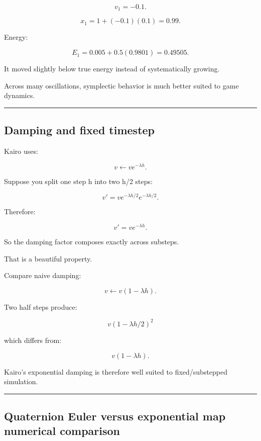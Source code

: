\[
v_1=-0.1.
\]

\[
x_1=1+(-0.1)(0.1)=0.99.
\]

Energy:

\[
E_1
=
0.005+
0.5(0.9801)
=
0.49505.
\]

It moved slightly below true energy instead of systematically growing.

Across many oscillations, symplectic behavior is much better suited to game dynamics.

\begin{center}\rule{0.5\linewidth}{0.5pt}\end{center}

\subsection{Damping and fixed timestep}\label{06-engine-ii-ch038-damping-and-fixed-timestep}

Kairo uses:

\[
v\leftarrow ve^{-\lambda h}.
\]

Suppose you split one step h into two h/2 steps:

\[
v'
=
v e^{-\lambda h/2}
e^{-\lambda h/2}.
\]

Therefore:

\[
v'
=
v e^{-\lambda h}.
\]

So the damping factor composes exactly across substeps.

That is a beautiful property.

Compare naive damping:

\[
v\leftarrow v(1-\lambda h).
\]

Two half steps produce:

\[
v(1-\lambda h/2)^2
\]

which differs from:

\[
v(1-\lambda h).
\]

Kairo's exponential damping is therefore well suited to fixed/substepped simulation.

\begin{center}\rule{0.5\linewidth}{0.5pt}\end{center}

\subsection{Quaternion Euler versus exponential map numerical comparison}\label{06-engine-ii-ch038-quaternion-euler-versus-exponential-map-numerical-comparison}

